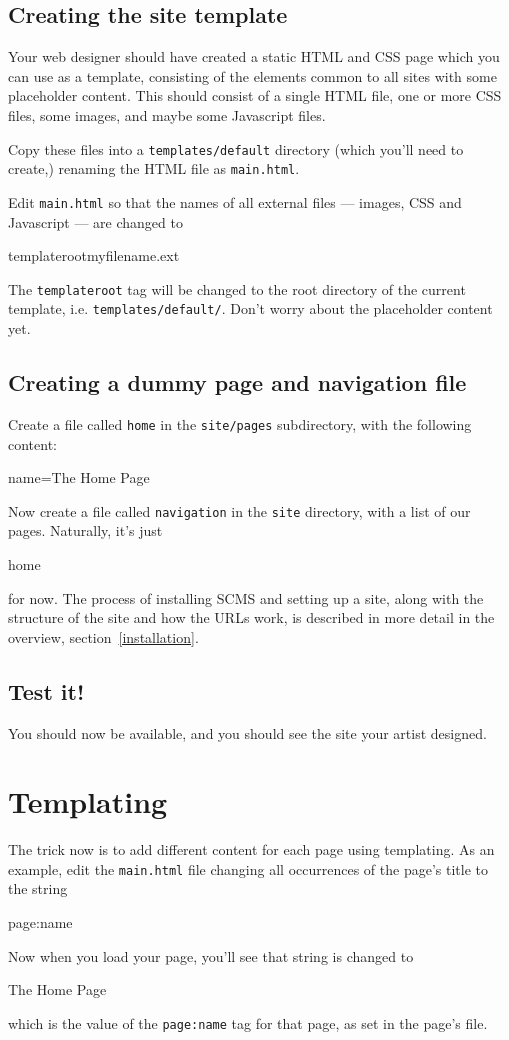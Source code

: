 \subsection{Creating the site template}
Your web designer should have created a static HTML and CSS page which
you can use as a template, consisting of the elements common to all
sites with some placeholder content. This should consist of a single
HTML file, one or more CSS files, some images, and maybe some Javascript files.

Copy these files into a \texttt{templates/default} directory (which you'll
need to create,) renaming the HTML file as \texttt{main.html}.

Edit \texttt{main.html} so that the names of all external files --- images,
CSS and Javascript --- are changed to
\begin{MyVerbatim}
{{templateroot}}myfilename.ext
\end{MyVerbatim}
The \texttt{{{templateroot}}} tag will be changed to the root directory
of the current template, i.e. \texttt{templates/default/}. Don't worry
about the placeholder content yet.

\subsection{Creating a dummy page and navigation file}
Create a file called \texttt{home} in the \texttt{site/pages} subdirectory,
with the following content:
\begin{MyVerbatim}
name=The Home Page
\end{MyVerbatim}

Now create a file called \texttt{navigation} in the \texttt{site} directory,
with a list of our pages. Naturally, it's just
\begin{MyVerbatim}
home
\end{MyVerbatim}
for now. The process of installing SCMS and setting up a site, along with the structure
of the site and how the URLs work, is described in more detail in the overview, section~\ref{installation}.

\subsection{Test it!}
You should now be available, and you should see the site your artist
designed.

\section{Templating}
The trick now is to add different content for each page using templating.
As an example, edit the \texttt{main.html} file changing all occurrences
of the page's title to the string
\begin{MyVerbatim}
{{page:name}}
\end{MyVerbatim}
Now when you load your page, you'll see that string is changed to
\begin{MyVerbatim}
The Home Page
\end{MyVerbatim}
which is the value of the \texttt{page:name} tag for that page, as set in
the page's file.

